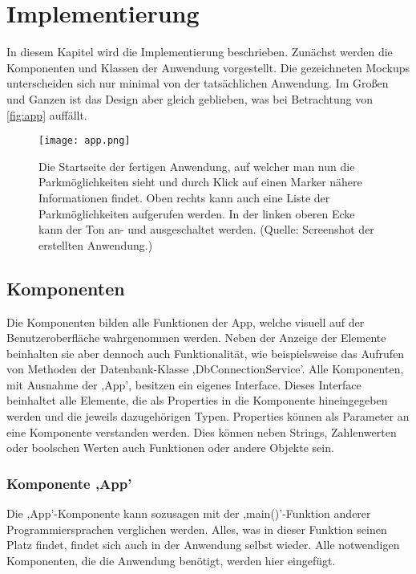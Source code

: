 \chapter{Implementierung}
\label{implementierung}

In diesem Kapitel wird die Implementierung beschrieben. Zunächst werden die Komponenten und Klassen der Anwendung vorgestellt. Die gezeichneten Mockups unterscheiden sich nur minimal von der tatsächlichen Anwendung. Im Großen und Ganzen ist das Design aber gleich geblieben, was bei Betrachtung von \autoref{fig:app} auffällt.

\begin{figure}[h!]
	\centering
	\texttt{[image: app.png]}
	\caption[Die Startseite der fertigen Anwendung, auf welcher man nun die Parkmöglichkeiten sieht und durch Klick auf einen Marker nähere Informationen findet. Oben rechts kann auch eine Liste der Parkmöglichkeiten aufgerufen werden. In der linken oberen Ecke kann der Ton an- und ausgeschaltet werden.]
	{Die Startseite der fertigen Anwendung, auf welcher man nun die Parkmöglichkeiten sieht und durch Klick auf einen Marker nähere Informationen findet. Oben rechts kann auch eine Liste der Parkmöglichkeiten aufgerufen werden. In der linken oberen Ecke kann der Ton an- und ausgeschaltet werden. (Quelle: Screenshot der erstellten Anwendung.)}
	\label{fig:app}
\end{figure}
\newpage
\section{Komponenten}
Die Komponenten bilden alle Funktionen der App, welche visuell auf der Benutzeroberfläche wahrgenommen werden. Neben der Anzeige der Elemente beinhalten sie aber dennoch auch Funktionalität, wie beispielsweise das Aufrufen von Methoden der Datenbank-Klasse ,DbConnectionService'. Alle Komponenten, mit Ausnahme der ,App', besitzen ein eigenes Interface. Dieses Interface beinhaltet alle Elemente, die als Properties in die Komponente hineingegeben werden und die jeweils dazugehörigen Typen. Properties können als Parameter an eine Komponente verstanden werden. Dies können neben Strings, Zahlenwerten oder boolschen Werten auch Funktionen oder andere Objekte sein.
\subsection{Komponente ,App'}
Die ,App'-Komponente kann sozusagen mit der ,main()'-Funktion anderer Programmiersprachen verglichen werden. Alles, was in dieser Funktion seinen Platz findet, findet sich auch in der Anwendung selbst wieder. Alle notwendigen Komponenten, die die Anwendung benötigt, werden hier eingefügt. 

